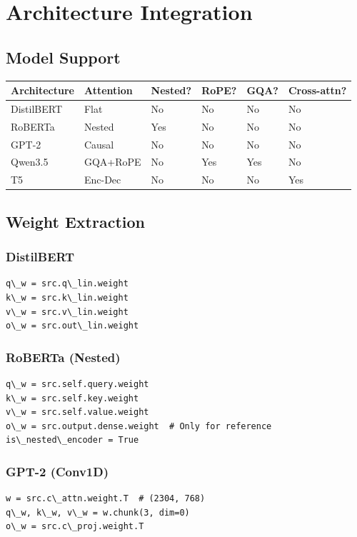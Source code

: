 \section{Architecture Integration}

\subsection{Model Support}

\begin{table}[H]
\centering
\small
\begin{tabular}{llllll}
\toprule
\textbf{Architecture} & \textbf{Attention} & \textbf{Nested?} & \textbf{RoPE?} & \textbf{GQA?} & \textbf{Cross-attn?} \\
\midrule
DistilBERT & Flat & No & No & No & No \\
RoBERTa & Nested & Yes & No & No & No \\
GPT-2 & Causal & No & No & No & No \\
Qwen3.5 & GQA+RoPE & No & Yes & Yes & No \\
T5 & Enc-Dec & No & No & No & Yes \\
\bottomrule
\end{tabular}
\end{table}

\subsection{Weight Extraction}

\subsubsection{DistilBERT}
\begin{lstlisting}
q\_w = src.q\_lin.weight
k\_w = src.k\_lin.weight
v\_w = src.v\_lin.weight
o\_w = src.out\_lin.weight
\end{lstlisting}

\subsubsection{RoBERTa (Nested)}
\begin{lstlisting}
q\_w = src.self.query.weight
k\_w = src.self.key.weight
v\_w = src.self.value.weight
o\_w = src.output.dense.weight  # Only for reference
is\_nested\_encoder = True
\end{lstlisting}

\subsubsection{GPT-2 (Conv1D)}
\begin{lstlisting}
w = src.c\_attn.weight.T  # (2304, 768)
q\_w, k\_w, v\_w = w.chunk(3, dim=0)
o\_w = src.c\_proj.weight.T
\end{lstlisting}

